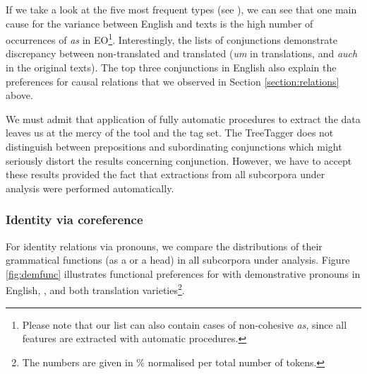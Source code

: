 \documentclass[output=paper]{langsci/langscibook.cls}
\begin{document}
If we take a look at the five most
frequent types (see ), we can see that one main cause for the variance between English and  texts is the high number of occurrences of  \textsl{as} in EO\footnote{Please note that our list can also contain cases of non-cohesive  \textsl{as}, since all features are extracted with automatic procedures.}. Interestingly, the  lists of conjunctions demonstrate discrepancy between non-translated and translated  (\textsl{um} in translations, and  \textsl{auch} in the original  texts). The top three conjunctions in English also explain the preferences for causal relations that we observed in Section \ref{section:relations} above. 

We must admit that application of fully automatic procedures to extract the data leaves us at the mercy of the tool and the tag set. The TreeTagger does not distinguish between prepositions and subordinating conjunctions which might seriously distort the results concerning conjunction. However, we have to accept these results provided the fact that extractions from all subcorpora under analysis were performed automatically. %

 
\subsubsection{Identity via coreference}\label{sec:identity}

For identity relations via pronouns, we compare the distributions of their grammatical functions (as a  or a head) in all subcorpora under analysis. Figure \ref{fig:demfunc} illustrates functional preferences for  with demonstrative pronouns in English, , and both translation varieties\footnote{The numbers are given in \% normalised per total number of tokens.}. 

%
\end{document}

